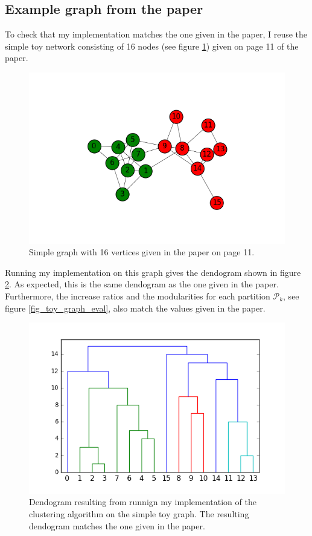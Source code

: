 \documentclass[12pt]{article}
\theoremstyle{definition}
\begin{document}
\subsection{Example graph from the paper}
To check that my implementation matches the one given in the paper, I reuse the simple toy network consisting of 16 nodes (see figure \ref{fig_toy_graph}) given on page 11 of the paper.
\begin{figure}
	\includegraphics[scale=0.6]{toy_graph}
	\centering
	\caption{Simple graph with 16 vertices given in the paper on page 11.}
	\label{fig_toy_graph}
\end{figure}
Running my implementation on this graph gives the dendogram shown in figure \ref{fig_toy_graph_dendogram}. As expected, this is the same dendogram as the one given in the paper. Furthermore, the increase ratios and the modularities for each  partition $\mathcal{P}_k$, see figure \ref{fig_toy_graph_eval}, also match the values given in the paper.

\begin{figure}
	\includegraphics[scale=0.5]{toy_graph_dendogram}
	\centering
	\caption{Dendogram resulting from runnign my implementation of the clustering algorithm on the simple toy graph. The resulting dendogram matches the one given in the paper.}
	\label{fig_toy_graph_dendogram}
\end{figure}
\end{document}
